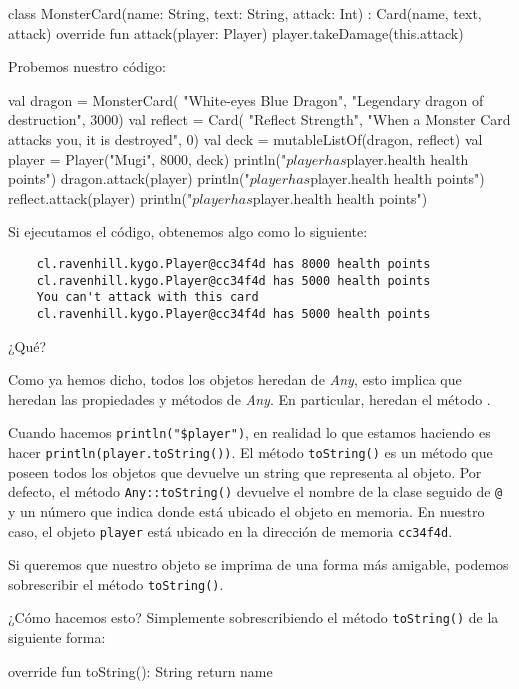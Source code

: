   \begin{kotlin}
    class MonsterCard(name: String, text: String, attack: Int) : Card(name, text, attack) {
      override fun attack(player: Player) {
        player.takeDamage(this.attack)
      }
    }
  \end{kotlin}

  Probemos nuestro código:

  \begin{kotlin}
    val dragon = MonsterCard(
      "White-eyes Blue Dragon", "Legendary dragon of destruction", 3000)
    val reflect = Card(
      "Reflect Strength", "When a Monster Card attacks you, it is destroyed", 0)
    val deck = mutableListOf(dragon, reflect)
    val player = Player("Mugi", 8000, deck)
    println("$player has ${player.health} health points")
    dragon.attack(player)
    println("$player has ${player.health} health points")
    reflect.attack(player)
    println("$player has ${player.health} health points")
  \end{kotlin}

  Si ejecutamos el código, obtenemos algo como lo siguiente:

  \begin{verbatim}
    cl.ravenhill.kygo.Player@cc34f4d has 8000 health points
    cl.ravenhill.kygo.Player@cc34f4d has 5000 health points
    You can't attack with this card
    cl.ravenhill.kygo.Player@cc34f4d has 5000 health points
  \end{verbatim}

  \begin{center}
    ¿Qué?
  \end{center}

  Como ya hemos dicho, todos los objetos heredan de \textit{Any}, esto implica que heredan las 
  propiedades y métodos de \textit{Any}.
  En particular, heredan el método .

  Cuando hacemos \texttt{println("\$player")}, en realidad lo que estamos haciendo es hacer 
  \texttt{println(player.toString())}.
  El método \texttt{toString()} es un método que poseen todos los objetos que devuelve un string
  que representa al objeto.
  Por defecto, el método \texttt{Any::toString()} devuelve el nombre de la clase seguido
  de \texttt{@} y un número que indica donde está ubicado el objeto en memoria.
  En nuestro caso, el objeto \texttt{player} está ubicado en la dirección de memoria 
  \texttt{cc34f4d}.

  \begin{defaultbox}
    Si queremos que nuestro objeto se imprima de una forma más amigable, podemos sobrescribir el
    método \texttt{toString()}.
  \end{defaultbox}

  ¿Cómo hacemos esto?
  Simplemente sobrescribiendo el método \texttt{toString()} de la siguiente forma:

  \begin{kotlin}
    override fun toString(): String {
      return name
    }  
  \end{kotlin}

